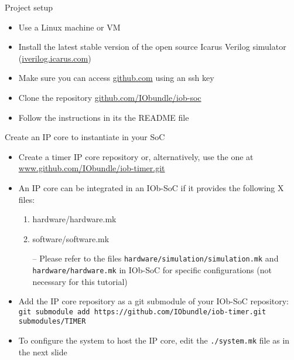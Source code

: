 \documentclass [xcolor=svgnames, t] {beamer}
\begin{document}
\begin{frame}{Project setup}
\begin{center}
  \begin{itemize}
    \item Use a Linux machine or VM
    \item Install the latest stable version of the open source Icarus Verilog simulator (\url{iverilog.icarus.com})
    \item Make sure you can access \url{github.com} using an ssh key
    \item Clone the repository \url{github.com/IObundle/iob-soc}
    \item Follow the instructions in its the README file
  \end{itemize}
\end{center}
\end{frame}


\begin{frame}{Create an IP core to instantiate in your SoC}
  \begin{itemize}
  \item Create a timer IP core repository or, alternatively, use the one at \url{www.github.com/IObundle/iob-timer.git}
  \item An IP core can be integrated in an IOb-SoC if it provides the following X files: 
    \begin{enumerate}
    \item hardware/hardware.mk
    \item software/software.mk
    \end{enumerate}
        \begin{itemize}
      \item[--] Please refer to the files {\tt hardware/simulation/simulation.mk} and {\tt hardware/hardware.mk} in IOb-SoC for specific configurations (not necessary for this tutorial)
    \end{itemize}
  \item Add the IP core repository as a git submodule of your IOb-SoC repository:\\
    {\tiny \tt git submodule add https://github.com/IObundle/iob-timer.git submodules/TIMER}
  \item To configure the system to host the IP core, edit the {\tt ./system.mk} file as in the next slide
  \end{itemize}
\end{frame}

\lstset{basicstyle=\ttfamily,columns=fullflexible}
\end{document}
